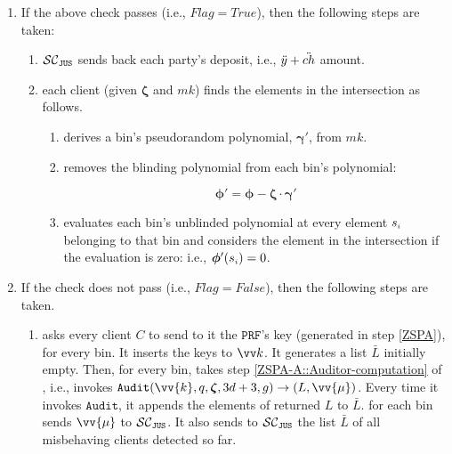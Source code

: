 \begin{enumerate}
\item\label{F-PSI::flag-is-true} If the above check passes (i.e., $Flag=True$), then the following steps are taken:

\begin{enumerate}
 \item $\mathcal{SC}_{\mathtt{JUS}}$ sends back each party's deposit, i.e., $\ddot{y}+\ddot{ch}$ amount.
 
  \item each client (given $\bm\zeta$ and $mk$) finds the elements in the intersection as follows. 
  \begin{enumerate}
  \item derives a bin's pseudorandom polynomial, $\bm\gamma'$, from $mk$. 
  
  \item removes the blinding polynomial from each bin's polynomial: 
  
  $$\bm\phi'=\bm\phi-\bm\zeta\cdot \bm\gamma'$$ 
  
  \item\label{F-PSI::find-intersection} evaluates each bin's unblinded polynomial at every element $s_{\scriptscriptstyle i}$ belonging to that bin and considers the element in the intersection if the evaluation is zero: i.e., $\bm\phi'(s_{\scriptscriptstyle i})=0$.
 
 \end{enumerate}
 
 
 \end{enumerate}
 
 \item\label{F-PSI::flag-is-false} If the check does not pass (i.e., $Flag=False$), then the following steps are taken.
 
 

 
 \begin{enumerate}
 

 \item\label{auditor}  \aud asks every client $    {  C}$ to send to it the  $\mathtt{PRF}$'s key (generated in step \ref{ZSPA}), for every bin. It inserts the keys to $\vv k$.  It generates a list $\bar L$ initially empty. Then, for every bin,  \aud takes step \ref{ZSPA-A::Auditor-computation} of \zspaa, i.e., invokes  $\mathtt{Audit}( \vv{{k}},  q, \bm\zeta, 3d+3, g)\rightarrow (L, \vv{{\mu}})$.  Every time it invokes $\mathtt{Audit}$, it appends the elements of returned $L$ to $\bar L$.  \aud for each bin sends  $ \vv{{\mu}}$ to $\mathcal{SC}_{\mathtt{JUS}}$. It also sends  to $\mathcal{SC}_{\mathtt{JUS}}$ the list $\bar L$ of all misbehaving clients detected so far.
 


\end{enumerate}
\end{enumerate}
